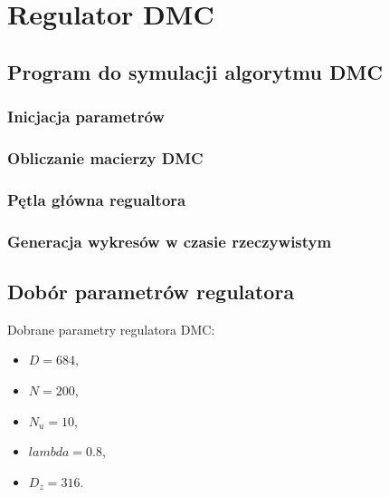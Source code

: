 \section{Regulator DMC}
\label{lab:zad4}
\subsection{Program do symulacji algorytmu DMC}
\label{lab:zad4:program}

\subsubsection{Inicjacja parametrów}

\newpage

\subsubsection{Obliczanie macierzy DMC}

\newpage


\subsubsection{Pętla główna regualtora}

\newpage


\subsubsection{Generacja wykresów w czasie rzeczywistym}

\newpage


\subsection{Dobór parametrów regulatora}
\label{lab:zad4:parametry}

Dobrane parametry regulatora DMC:
\begin{itemize}
    \item $D=684$, 
    \item $N=200$, 
    \item $N_{u}=10$, 
    \item $lambda=0.8$, 
    \item $D_{z}=316$.
\end{itemize}

\newpage
